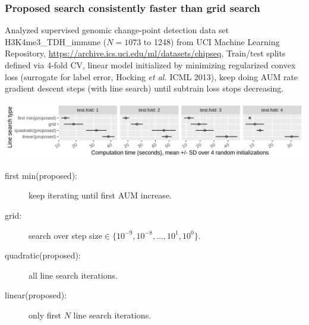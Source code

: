 \documentclass[t]{beamer}
\begin{document}
\begin{frame}
  \frametitle{Proposed search consistently faster than grid search}

  Analyzed supervised genomic change-point detection data set
  H3K4me3\_TDH\_immune ($N=1073$ to 1248)
  from UCI Machine Learning Repository,
  {\scriptsize \url{https://archive.ics.uci.edu/ml/datasets/chipseq},}
  Train/test splits defined via 4-fold CV, linear model initialized by
  minimizing regularized convex loss (surrogate for label error,
  Hocking \emph{et al.} ICML 2013), keep doing AUM rate gradient
  descent steps (with line search) until subtrain loss stops decreasing.

  \includegraphics[width=\textwidth]{figure-line-search-complexity-compare-H3K4me3_TDH_immune-equal_labels-rate-IntervalRegressionCV-seconds}

  \begin{description}
  \item[first min(proposed):] keep iterating until first AUM
    increase.
  \item[grid:] search over step
    size$\in\{10^{-9},10^{-8},\dots,10^1,10^0\}$.
  \item[quadratic(proposed):] all line search iterations.
  \item[linear(proposed):] only first $N$ line search iterations.
  \end{description}
\end{frame}
\end{document}
